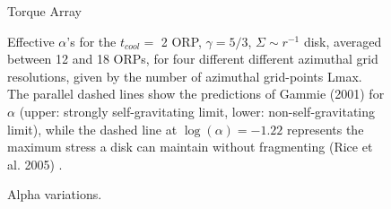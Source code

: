 \documentclass[manuscript]{aastex} %
\begin{document}
\begin{figure}
\caption
{
Torque Array}
\end{figure}



\begin{figure}
\label{fig:alpha_v_radius}
\caption
{Effective $\alpha$'s for the $t_{cool} =$ 2 ORP, $\gamma = 5/3$, $\Sigma \sim r^{ -1}$ disk, averaged between 12 and 18 ORPs, for four different different azimuthal grid resolutions, given by the number of azimuthal grid-points Lmax. The parallel dashed lines show the predictions of Gammie (2001) for $\alpha$ (upper: strongly self-gravitating limit, lower: non-self-gravitating limit), while the dashed line at $\log(\alpha) = -1.22$ represents the maximum stress a disk can maintain without fragmenting (Rice et al. 2005) . 
}
\end{figure}
\newpage

\begin{figure}
\caption
{Alpha variations.}
\end{figure}
\end{document}
